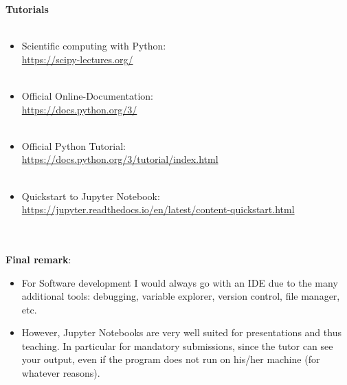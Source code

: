 \begin{frame}[c]
\textbf{Tutorials}
~\\~\\
\begin{itemize}
	\item Scientific computing with Python:\\
	 \url{https://scipy-lectures.org/}~\\~\\
	\item Official Online-Documentation:\\
	\url{https://docs.python.org/3/}~\\~\\
	\item Official Python Tutorial:\\
	\url{https://docs.python.org/3/tutorial/index.html}~\\~\\
	\item
	Quickstart to Jupyter Notebook:
	\\{\centering\url{https://jupyter.readthedocs.io/en/latest/content-quickstart.html}}~\\~\\
\end{itemize}
%
~\\
\textbf{Final remark}:
\begin{itemize}
	\item
	For Software development I would always go with an IDE due to the many
	additional tools: debugging, variable explorer, version control, file manager, etc.
	\item
	However, Jupyter Notebooks are very well suited for presentations and
	thus teaching. In particular for mandatory submissions, since the
	tutor can see your output, even if the program does not run on his/her
	machine (for whatever reasons).
\end{itemize}
\end{frame}
